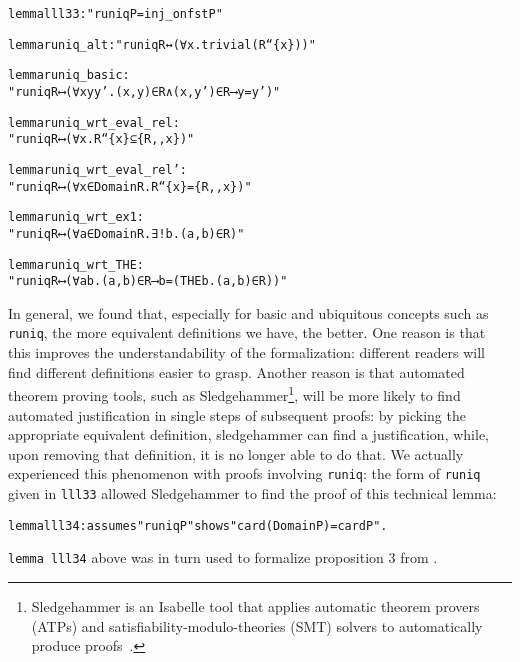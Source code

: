 \documentclass[
]{llncs}
\newenvironment{mytable}{
\vspace{0.2ex}
\begin{center}\begin{minipage}
{0.9\textwidth}\renewcommand{\baselinestretch}{0.75}\begin{small}}
{\end{small}\end{minipage}\end{center}
\vspace{0.1ex}
}
\newcommand{\I}{Isabelle}
\newcommand{\query}[1]{\marginnote{\raggedright\footnotesize\itshape\hrule\smallskip{#1}\smallskip\hrule}}\renewcommand{\query}[1]{} \newcommand{\rnote}[1]{\query{#1}}
\newcommand{\lnote}[1]{\reversemarginpar\query{#1}\normalmarginpar}
\begin{document}
\begin{mytable}\renewcommand{\baselinestretch}{0.65}
\begin{alltt}
lemma lll33: "runiq P=inj_on fst P"

lemma runiq_alt: "runiq R ↔ (∀ x . trivial (R `` \{x\}))"

lemma runiq_basic: 
"runiq R ⟷ (∀ x y y' . (x, y) ∈ R ∧ (x, y') ∈ R ⟶ y = y')"

lemma runiq_wrt_eval_rel: 
"runiq R ⟷ (∀x . R `` \{x\} ⊆ \{R ,, x\})"

lemma runiq_wrt_eval_rel': 
"runiq R ⟷ (∀x ∈ Domain R . R `` \{x\} = \{R ,, x\})"

lemma runiq_wrt_ex1: 
"runiq R ⟷ (∀ a ∈ Domain R . ∃! b . (a, b) ∈ R)"

lemma runiq_wrt_THE: 
"runiq R ⟷ (∀ a b . (a, b) ∈ R ⟶ b = (THE b . (a, b) ∈ R))"
\end{alltt}\end{mytable}

In general, we found that, especially for basic and ubiquitous concepts such as \verb|runiq|\rnote{MK: put runiq into verbose and `as' to `such as'}, the more equivalent definitions we have\lnote{MK: `one has' to `we have'}, the better.
One reason is that this improves the understandability of the formalization: different readers will find different definitions easier to grasp.
Another reason is that automated theorem proving tools, such as Sledgehammer\footnote{Sledgehammer is an \I{} tool that applies automatic theorem provers (ATPs) and satisfiability-modulo-theories (SMT) solvers to automatically produce proofs~\cite{isabelle-sledgehammer}.}, will be more likely to find automated justification in single steps of subsequent proofs: by picking the appropriate equivalent definition, sledgehammer can find a justification, while, upon removing that definition, it is no longer able to do that. 
We actually experienced this phenomenon with proofs involving \verb|runiq|:
the form of \verb|runiq| given in \verb|lll33| 
allowed Sledgehammer to find the proof of this technical lemma:

\begin{mytable}
\begin{alltt}
lemma lll34: assumes "runiq P" shows "card (Domain P) = card P".
\end{alltt}
\end{mytable}

\noindent \verb|lemma lll34| above was in turn used to formalize proposition 3 from \cite{mas-04}.
\end{document}

